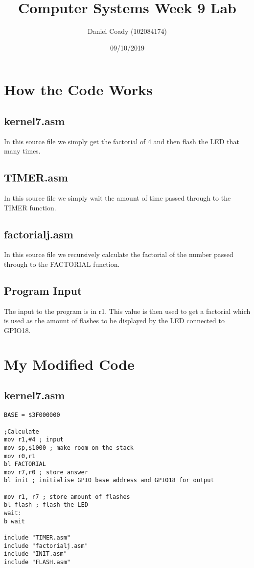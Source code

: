 \documentclass[11pt]{scrartcl}
\title{Computer Systems Week 9 Lab}
\author{Daniel Coady (102084174)}
\date{09/10/2019}
\begin{document}
\maketitle

\section*{How the Code Works}

\subsection*{kernel7.asm}
In this source file we simply get the factorial of 4 and then flash the LED that many
times.

\subsection*{TIMER.asm}
In this source file we simply wait the amount of time passed through to the TIMER function.

\subsection*{factorialj.asm}
In this source file we recursively calculate the factorial of the number passed through
to the FACTORIAL function.

\subsection*{Program Input}
The input to the program is in r1. This value is then used to get a factorial which is
used as the amount of flashes to be displayed by the LED connected to GPIO18.

\pagebreak

\section*{My Modified Code}

\subsection*{kernel7.asm}
\begin{verbatim}
BASE = $3F000000

;Calculate
mov r1,#4 ; input
mov sp,$1000 ; make room on the stack
mov r0,r1  
bl FACTORIAL
mov r7,r0 ; store answer
bl init ; initialise GPIO base address and GPIO18 for output

mov r1, r7 ; store amount of flashes
bl flash ; flash the LED
wait:
b wait

include "TIMER.asm"
include "factorialj.asm"
include "INIT.asm"
include "FLASH.asm"
\end{verbatim}
\end{document}
